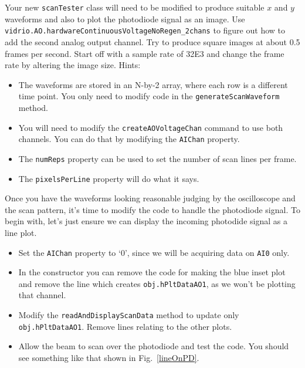 \documentclass[a4paper]{report}
\begin{document}
\noindent
Your new \texttt{scanTester} class will need to be modified to produce suitable $x$ and $y$ waveforms and also to plot the photodiode signal as an image. 
Use \texttt{vidrio.AO.hardwareContinuousVoltageNoRegen\_2chans} to figure out how to add the second analog output channel.
Try to produce square images at about 0.5 frames per second. 
Start off with a sample rate of 32E3 and change the frame rate by altering the image size.
Hints:
\begin{itemize}
    \setlength\itemsep{0.15em}
    \item The waveforms are stored in an N-by-2 array, where each row is a different time point. You only need to modify code in the \texttt{generateScanWaveform} method.
    \item You will need to modify the \texttt{createAOVoltageChan} command to use both channels. You can do that by modifying the \texttt{AIChan} property.
    \item The \texttt{numReps} property can be used to set the number of scan lines per frame.
    \item The \texttt{pixelsPerLine} property will do what it says. 
\end{itemize}

\noindent

Once you have the waveforms looking reasonable judging by the oscilloscope and the scan pattern, it's time to modify the code to handle the photodiode signal. 
To begin with, let's just ensure we can display the incoming photodide signal as a line plot.

\begin{itemize}
    \setlength\itemsep{0.15em}
    \item Set the \texttt{AIChan} property to `0', since we will be acquiring data on \texttt{AI0} only.
    \item In the constructor you can remove the code for making the blue inset plot and remove the line which creates \texttt{obj.hPltDataAO1}, as we won't be plotting that channel.
    \item Modify the \texttt{readAndDisplayScanData} method to update only \texttt{obj.hPltDataAO1}. Remove lines relating to the other plots. 
    \item Allow the beam to scan over the photodiode and test the code. 
    You should see something like that shown in Fig.~\ref{lineOnPD}. 
\end{itemize}

\noindent
\end{document}
